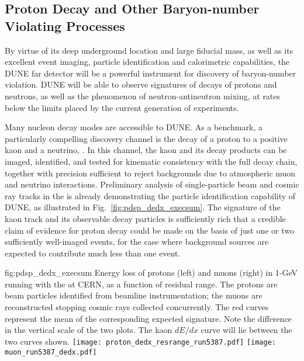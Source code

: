 \subsection{Proton Decay and Other 
Baryon-number Violating Processes}

By virtue of its deep underground location and large fiducial 
mass, as well as its excellent event imaging, particle 
identification and 
calorimetric capabilities, the DUNE far detector will be 
a powerful instrument for discovery of baryon-number violation.
DUNE will be able to observe signatures of decays of protons and 
neutrons, as well as the phenomenon of neutron-antineutron mixing, 
at rates below the limits placed by the current generation of 
experiments.

Many nucleon decay modes are accessible to DUNE.  
As a benchmark, a particularly compelling discovery channel 
is the decay of a proton to a positive kaon and a neutrino, 
\ptoknubar.  In this channel, the kaon and its decay products 
can be imaged, identified, and tested for kinematic consistency 
with the full decay chain, together with precision sufficient to 
reject backgrounds due to atmospheric muon and neutrino 
interactions. 
Preliminary analysis of single-particle beam and cosmic ray tracks 
in the  \lartpc is already demonstrating the particle 
identification capability of DUNE, as illustrated in 
Fig.~\ref{fig:pdsp_dedx_execsum}.  
The signature of the kaon track and its observable decay particles is 
sufficiently rich that a credible claim of evidence for 
proton decay could be made on the basis of just 
one or two sufficiently well-imaged events, for the case 
where background sources are expected to contribute much less 
than one event.

\begin{dunefigure}{fig:pdsp_dedx_execsum}
{Energy loss of protons (left) and muons (right) in 1-GeV  
running with the  \lartpc at CERN, as a function of 
residual range.  The protons are beam particles identified from 
beamline instrumentation; the muons are reconstructed stopping 
cosmic rays collected concurrently.  
The red curves represent the mean of the 
corresponding expected signature.  Note the difference in 
the vertical scale of the two plots.  The kaon $dE/dx$ curve 
will lie between the two curves shown.}
\texttt{[image: proton\_dedx\_resrange\_run5387.pdf]}\hspace{0.05\linewidth}
\texttt{[image: muon\_run5387\_dedx.pdf]}
\end{dunefigure}

